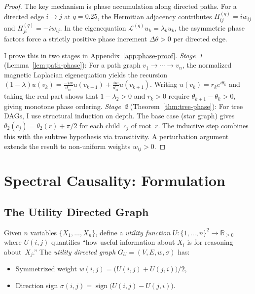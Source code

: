 \documentclass[twoside,11pt]{article}
\DeclareMathOperator{\sign}{sign}
\newcommand{\R}{\mathbb{R}}
\begin{document}
\begin{proof}
The key mechanism is phase accumulation along directed paths.  For a
directed edge $i\to j$ at $q=0.25$, the Hermitian adjacency contributes
$H^{(q)}_{ij}=iw_{ij}$ and $H^{(q)}_{ji}=-iw_{ij}$.  In the
eigenequation $\mathcal{L}^{(q)}u_k=\lambda_k u_k$, the asymmetric
phase factors force a strictly positive phase increment
$\Delta\theta>0$ per directed edge.

I prove this in two stages in Appendix~\ref{app:phase-proof}.
\emph{Stage~1} (Lemma~\ref{lem:path-phase}): For a path graph
$v_1\to\cdots\to v_n$, the normalized magnetic Laplacian eigenequation
yields the recursion
$(1-\lambda)u(v_k) = \frac{-iw}{d_{v_k}}u(v_{k-1})
+ \frac{iw}{d_{v_k}}u(v_{k+1})$.
Writing $u(v_k)=r_k e^{i\theta_k}$ and taking the real part shows that
$1-\lambda_2>0$ and $r_k>0$ require
$\theta_{k+1}-\theta_k>0$, giving monotone phase ordering.
\emph{Stage~2} (Theorem~\ref{thm:tree-phase}): For tree DAGs, I use
structural induction on depth.  The base case (star graph) gives
$\theta_2(c_j)=\theta_2(r)+\pi/2$ for each child~$c_j$ of root~$r$.
The inductive step combines this with the subtree hypothesis via
transitivity.  A perturbation argument extends the result to
non-uniform weights $w_{ij}>0$.
\end{proof}

\section{Spectral Causality: Formulation}
\label{sec:formulation}

\subsection{The Utility Directed Graph}

\begin{definition}
\label{def:utility-graph}
Given $n$ variables $\{X_1,\dots,X_n\}$, define a \emph{utility function}
$U:\{1,\dots,n\}^2\to\R_{\ge 0}$ where $U(i,j)$ quantifies ``how useful
information about $X_i$ is for reasoning about~$X_j$.''  The
\emph{utility directed graph} $G_U=(V,E,w,\sigma)$ has:
\begin{itemize}
\item Symmetrized weight $w(i,j)=\bigl(U(i,j)+U(j,i)\bigr)/2$,
\item Direction sign
  $\sigma(i,j)=\sign\bigl(U(i,j)-U(j,i)\bigr)$.
\end{itemize}
\end{definition}
\end{document}
